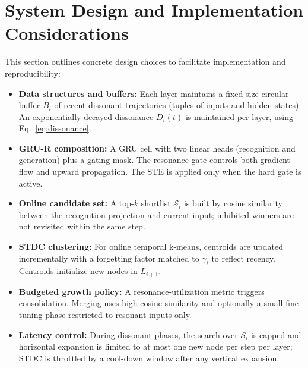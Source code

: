 \documentclass{article}
\numberwithin{figure}{section}
\numberwithin{table}{section}
\numberwithin{algorithm}{section}
\begin{document}
\section{System Design and Implementation Considerations}
This section outlines concrete design choices to facilitate implementation and reproducibility:
\begin{itemize}
    \item \textbf{Data structures and buffers:} Each layer maintains a fixed-size circular buffer $B_i$ of recent dissonant trajectories (tuples of inputs and hidden states). An exponentially decayed dissonance $D_i(t)$ is maintained per layer, using Eq.~\eqref{eq:dissonance}.
    \item \textbf{GRU-R composition:} A GRU cell with two linear heads (recognition and generation) plus a gating mask. The resonance gate controls both gradient flow and upward propagation. The STE is applied only when the hard gate is active.
    \item \textbf{Online candidate set:} A top-$k$ shortlist $\mathcal{S}_i$ is built by cosine similarity between the recognition projection and current input; inhibited winners are not revisited within the same step.
    \item \textbf{STDC clustering:} For online temporal k-means, centroids are updated incrementally with a forgetting factor matched to $\gamma_i$ to reflect recency. Centroids initialize new nodes in $L_{i+1}$.
    \item \textbf{Budgeted growth policy:} A resonance-utilization metric triggers consolidation. Merging uses high cosine similarity and optionally a small fine-tuning phase restricted to resonant inputs only.
    \item \textbf{Latency control:} During dissonant phases, the search over $\mathcal{S}_i$ is capped and horizontal expansion is limited to at most one new node per step per layer; STDC is throttled by a cool-down window after any vertical expansion.
\end{itemize}
\end{document}
